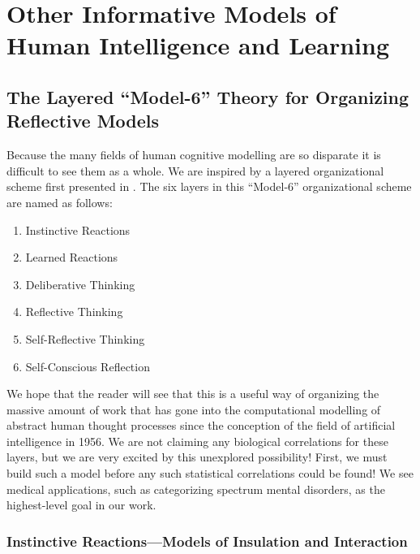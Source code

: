 \chapter{Other Informative Models of Human Intelligence and Learning}
\label{other_models-chapter}
	      
\section{The Layered ``Model-6'' Theory for Organizing Reflective Models}

Because the many fields of human cognitive modelling are so disparate it is difficult to see them as a whole.  
We are inspired by a layered organizational scheme first presented in \cite{minsky2006em-ch5}.
The six layers in this ``Model-6'' organizational scheme are named as follows:

\begin{enumerate}
\item{Instinctive Reactions}
\item{Learned Reactions}
\item{Deliberative Thinking}
\item{Reflective Thinking}
\item{Self-Reflective Thinking}
\item{Self-Conscious Reflection}
\end{enumerate}

We hope that the reader will see that this is a useful way of organizing the massive amount of work that has gone into the computational modelling of abstract human thought processes since the conception of the field of artificial intelligence in 1956.
We are not claiming any biological correlations for these layers, but we are very excited by this unexplored possibility!
First, we must build such a model before any such statistical correlations could be found!
We see medical applications, such as categorizing spectrum mental disorders, as the highest-level goal in our work.

\subsection{Instinctive Reactions---Models of Insulation and Interaction}

